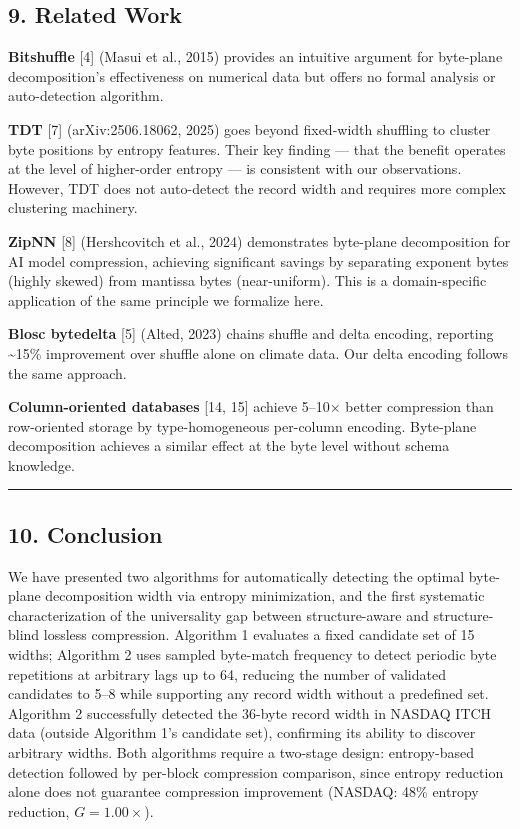 \documentclass[
  11pt,
  letterpaper,
]{article}
\makeatletter
\renewcommand{\_}{\bpd@origunderscore\allowbreak}
\makeatother
\begin{document}
\hypertarget{related-work}{%
\subsection{9. Related Work}\label{related-work}}

\textbf{Bitshuffle} {[}4{]} (Masui et al., 2015) provides an intuitive
argument for byte-plane decomposition's effectiveness on numerical data
but offers no formal analysis or auto-detection algorithm.

\textbf{TDT} {[}7{]} (arXiv:2506.18062, 2025) goes beyond fixed-width
shuffling to cluster byte positions by entropy features. Their key
finding --- that the benefit operates at the level of higher-order
entropy --- is consistent with our observations. However, TDT does not
auto-detect the record width and requires more complex clustering
machinery.

\textbf{ZipNN} {[}8{]} (Hershcovitch et al., 2024) demonstrates
byte-plane decomposition for AI model compression, achieving significant
savings by separating exponent bytes (highly skewed) from mantissa bytes
(near-uniform). This is a domain-specific application of the same
principle we formalize here.

\textbf{Blosc bytedelta} {[}5{]} (Alted, 2023) chains shuffle and delta
encoding, reporting \textasciitilde15\% improvement over shuffle alone
on climate data. Our delta encoding follows the same approach.

\textbf{Column-oriented databases} {[}14, 15{]} achieve 5--10× better
compression than row-oriented storage by type-homogeneous per-column
encoding. Byte-plane decomposition achieves a similar effect at the byte
level without schema knowledge.

\begin{center}\rule{0.5\linewidth}{0.5pt}\end{center}

\hypertarget{conclusion}{%
\subsection{10. Conclusion}\label{conclusion}}

We have presented two algorithms for automatically detecting the optimal
byte-plane decomposition width via entropy minimization, and the first
systematic characterization of the universality gap between
structure-aware and structure-blind lossless compression. Algorithm 1
evaluates a fixed candidate set of 15 widths; Algorithm 2 uses sampled
byte-match frequency to detect periodic byte repetitions at arbitrary
lags up to 64, reducing the number of validated candidates to 5--8 while
supporting any record width without a predefined set. Algorithm 2
successfully detected the 36-byte record width in NAS\-DAQ ITCH data
(outside Algorithm 1's candidate set), confirming its ability to
discover arbitrary widths. Both algorithms require a two-stage design:
entropy-based detection followed by per-block compression comparison,
since entropy reduction alone does not guarantee compression improvement
(NAS\-DAQ: 48\% entropy reduction, \(G = 1.00\times\)).
\end{document}
